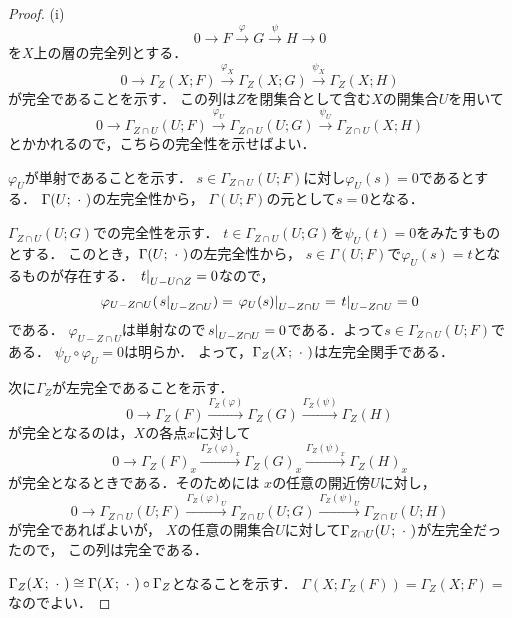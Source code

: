 \begin{proof}
    (i) 
    \[
        0\to F\overset{\varphi}{\to}G\overset{\psi}{\to}H\to0
    \]
    を\(X\)上の層の完全列とする．
    \[
        0\to \Gamma_Z(X;F)\overset{\varphi_X}{\to}
        \Gamma_Z(X;G)\overset{\psi_X}{\to}\Gamma_Z(X;H)
    \]
    が完全であることを示す．
    この列は\(Z\)を閉集合として含む\(X\)の開集合\(U\)を用いて
    \[
        0\to \Gamma_{Z\cap U}(U;F)\overset{\varphi_U}{\to}
        \Gamma_{Z\cap U}(U;G)\overset{\psi_U}{\to}\Gamma_{Z\cap U}(X;H)
    \]とかかれるので，こちらの完全性を示せばよい．
    
    \(\varphi_U\)が単射であることを示す．
    \(s\in\Gamma_{Z\cap U}(U;F)\)に対し\(\varphi_U(s)=0\)であるとする．
    \(\Gamma(U;\blk)\)の左完全性から，
    \(\Gamma(U;F)\)の元として\(s=0\)となる．

    \(\Gamma_{Z\cap U}(U;G)\)での完全性を示す．
    \(t\in\Gamma_{Z\cap U}(U;G)\)を\(\psi_U(t)=0\)をみたすものとする．
    このとき，\(\Gamma(U;\blk)\)の左完全性から，
    \(s\in\Gamma(U;F)\)で\(\varphi_U(s)=t\)となるものが存在する．
    \(\mres[t]{U-U\cap Z}=0\)なので，\[
        \varphi_{U-Z\cap U}(\mres[s]{U-Z\cap U})
        =\mres[\varphi_{U}(s)]{U-Z\cap U}
        =\mres[t]{U-Z\cap U}
        =0
    \]である．
    \(\varphi_{U-Z\cap U}\)は単射なので\(
        \mres[s]{U-Z\cap U}=0
    \)である．よって\(s\in\Gamma_{Z\cap U}(U;F)\)である．
    \(\psi_{U}\circ\varphi_{U}=0\)は明らか．
    よって，\(\Gamma_Z(X;\blk)\)は左完全関手である．

    次に\(\Gamma_Z\)が左完全であることを示す．
    \[
        0\to \Gamma_Z(F)\overset{\Gamma_Z(\varphi)}{\to}
        \Gamma_Z(G)\overset{\Gamma_Z(\psi)}{\to}
        \Gamma_Z(H)
    \]
    が完全となるのは，\(X\)の各点\(x\)に対して
    \[
        0\to \Gamma_Z(F)_x\overset{\Gamma_Z(\varphi)_x}{\to}
        \Gamma_Z(G)_x\overset{\Gamma_Z(\psi)_x}{\to}
        \Gamma_Z(H)_x
    \]
    が完全となるときである．そのためには
    \(x\)の任意の開近傍\(U\)に対し，
    \[
        0\to \Gamma_{Z\cap U}(U;F)
        \overset{\Gamma_Z(\varphi)_U}{\to}
        \Gamma_{Z\cap U}(U;G)\overset{\Gamma_Z(\psi)_U}{\to}
        \Gamma_{Z\cap U}(U;H)
    \]
    が完全であればよいが，
    \(X\)の任意の開集合\(U\)に対して\(
        \Gamma_{Z\cap U}(U;\blk)
    \)が左完全だったので，
    この列は完全である．

    \(\Gamma_Z(X;\blk)\cong\Gamma(X;\blk)\circ\Gamma_Z\)となることを示す．
    \(\Gamma(X;\Gamma_Z(F))=\Gamma_Z(X;F)=\)なのでよい．


\end{proof}
